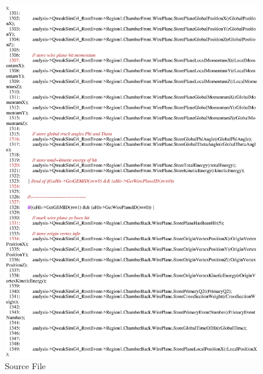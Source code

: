 \begin{figure}[h]
  \hspace{0cm}
  \includegraphics[scale=0.8]{./figures13/QweakSimEventAction.cc-p23.eps}
  \caption{Source File}
           \label{fig:XIII-SC-38}
\end{figure}

\clearpage


